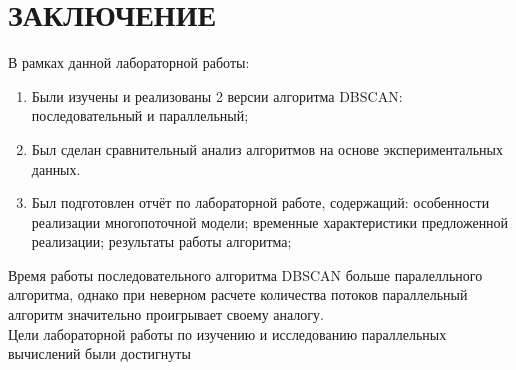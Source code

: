 \chapter*{ЗАКЛЮЧЕНИЕ}

В рамках данной лабораторной работы:

\begin{enumerate}
    \item Были изучены и реализованы 2 версии алгоритма DBSCAN: последовательный и параллельный;
    \item Был сделан сравнительный анализ алгоритмов на основе экспериментальных данных.
    \item Был подготовлен отчёт по лабораторной работе, содержащий: особенности реализации многопоточной модели; 
        временные характеристики предложенной реализации;
        результаты работы алгоритма;
\end{enumerate}
\indent\indent Время работы последовательного алгоритма DBSCAN больше паралелльного алгоритма, однако при неверном расчете количества потоков параллельный алгоритм значительно проигрывает своему аналогу.
\\
\indent Цели лабораторной работы по изучению и исследованию параллельных вычислений были достигнуты
